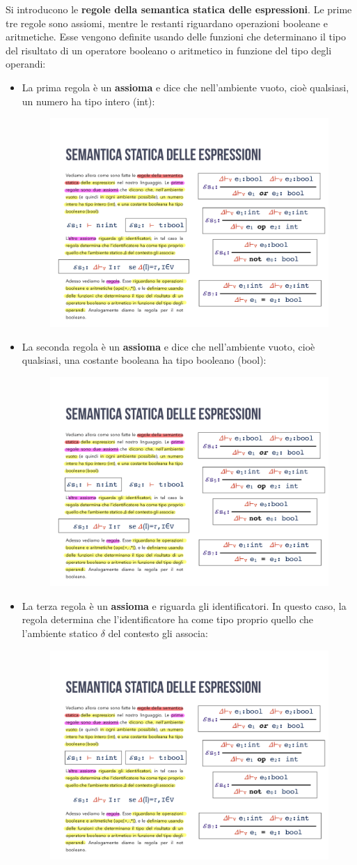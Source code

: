 \documentclass[a4paper]{article}
\begin{document}
	Si introducono le \textcolor{Red3}{\textbf{regole della semantica statica delle espressioni}}. Le prime tre regole sono assiomi, mentre le restanti riguardano operazioni booleane e aritmetiche. Esse vengono definite usando delle funzioni che determinano il tipo del risultato di un operatore booleano o aritmetico in funzione del tipo degli operandi:
	\begin{itemize}
		\item La prima regola è un \textbf{assioma} e dice che nell'ambiente vuoto, cioè qualsiasi, un numero ha tipo intero (int):
		\begin{figure}[!htp]
			\centering
			\includegraphics[width=.3\textwidth]{img/regola_semantica-1.pdf}
		\end{figure}
	
		\item La seconda regola è un \textbf{assioma} e dice che nell'ambiente vuoto, cioè qualsiasi, una costante booleana ha tipo booleano (bool):
		\begin{figure}[!htp]
			\centering
			\includegraphics[width=.3\textwidth]{img/regola_semantica-2.pdf}
		\end{figure}
	
		\item La terza regola è un \textbf{assioma} e riguarda gli identificatori. In questo caso, la regola determina che l'identificatore ha come tipo proprio quello che l'ambiente statico $\delta$ del contesto gli associa:
		\begin{figure}[!htp]
			\centering
			\includegraphics[width=.6\textwidth]{img/regola_semantica-3.pdf}
		\end{figure}
	

\end{itemize}
\end{document}

